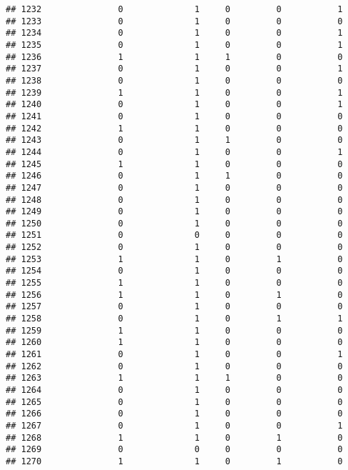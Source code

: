 \documentclass[]{article}
\begin{document}
\begin{verbatim}
## 1232               0              1     0         0           1
## 1233               0              1     0         0           0
## 1234               0              1     0         0           1
## 1235               0              1     0         0           1
## 1236               1              1     1         0           0
## 1237               0              1     0         0           1
## 1238               0              1     0         0           0
## 1239               1              1     0         0           1
## 1240               0              1     0         0           1
## 1241               0              1     0         0           0
## 1242               1              1     0         0           0
## 1243               0              1     1         0           0
## 1244               0              1     0         0           1
## 1245               1              1     0         0           0
## 1246               0              1     1         0           0
## 1247               0              1     0         0           0
## 1248               0              1     0         0           0
## 1249               0              1     0         0           0
## 1250               0              1     0         0           0
## 1251               0              0     0         0           0
## 1252               0              1     0         0           0
## 1253               1              1     0         1           0
## 1254               0              1     0         0           0
## 1255               1              1     0         0           0
## 1256               1              1     0         1           0
## 1257               0              1     0         0           0
## 1258               0              1     0         1           1
## 1259               1              1     0         0           0
## 1260               1              1     0         0           0
## 1261               0              1     0         0           1
## 1262               0              1     0         0           0
## 1263               1              1     1         0           0
## 1264               0              1     0         0           0
## 1265               0              1     0         0           0
## 1266               0              1     0         0           0
## 1267               0              1     0         0           1
## 1268               1              1     0         1           0
## 1269               0              0     0         0           0
## 1270               1              1     0         1           0

\end{verbatim}
\end{document}
